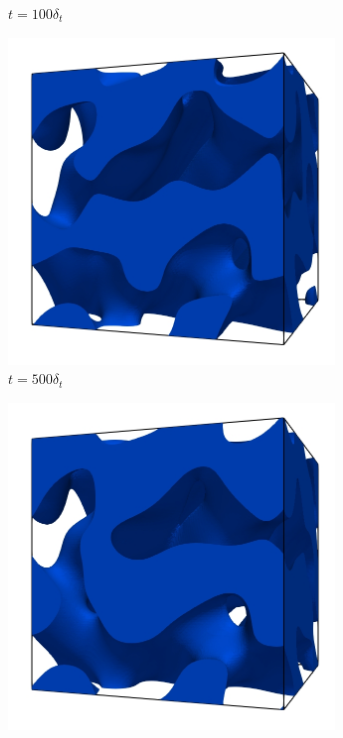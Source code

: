 \begin{figure}[htb]
\begin{subfigure}[t]{0.45\textwidth}
        \caption{$t = 100 \delta_t$}
    \end{subfigure}
    \begin{subfigure}[t]{0.45\textwidth}
        \centering
        \includegraphics[width=0.95\textwidth]{Imagenes/Maxwell3D/Maxwell3D_sim/Imagenes/t_500}
        \caption{$t = 500 \delta_t$}
    \end{subfigure}    
    \begin{subfigure}[t]{0.45\textwidth}
        \centering
        \includegraphics[width=0.95\textwidth]{Imagenes/Maxwell3D/Maxwell3D_sim/Imagenes/t_1000}

\end{subfigure}
\end{figure}
